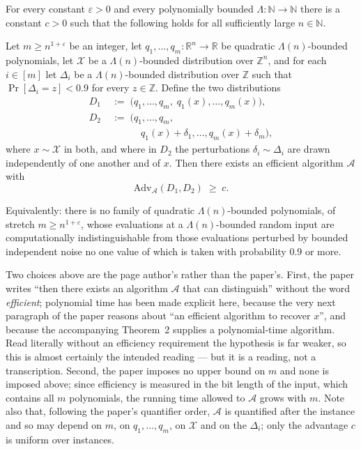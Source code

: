\documentclass{aicr-conjecture}
\newcommand{\ZZ}{\mathbb{Z}}
\newcommand{\RR}{\mathbb{R}}
\newcommand{\NN}{\mathbb{N}}
\newcommand{\cA}{\mathcal{A}}
\newcommand{\cX}{\mathcal{X}}
\newcommand{\Adv}{\mathrm{Adv}}
\begin{document}
\begin{conjecture}\label{conj:main}
For every constant $\varepsilon > 0$ and every polynomially bounded
$\Lambda : \NN \to \NN$ there is a constant $c > 0$ such that the
following holds for all sufficiently large $n \in \NN$.

Let $m \ge n^{1+\varepsilon}$ be an integer, let
$q_1, \dots, q_m : \RR^n \to \RR$ be quadratic $\Lambda(n)$-bounded
polynomials, let $\cX$ be a $\Lambda(n)$-bounded distribution over
$\ZZ^n$, and for each $i \in [m]$ let $\Delta_i$ be a
$\Lambda(n)$-bounded distribution over $\ZZ$ such that
$\Pr[\Delta_i = z] < 0.9$ for every $z \in \ZZ$. Define the two
distributions
\begin{align*}
  D_1 &\;:=\; \bigl( q_1, \dots, q_m,\; q_1(x), \dots, q_m(x) \bigr), \\
  D_2 &\;:=\; \bigl( q_1, \dots, q_m, \\
      &\qquad\quad\; q_1(x) + \delta_1, \dots, q_m(x) + \delta_m \bigr),
\end{align*}
where $x \sim \cX$ in both, and where in $D_2$ the perturbations
$\delta_i \sim \Delta_i$ are drawn independently of one another and of
$x$. Then there exists an efficient algorithm $\cA$ with
\[
  \Adv_{\cA}(D_1, D_2) \;\ge\; c .
\]

Equivalently: there is no family of quadratic $\Lambda(n)$-bounded
polynomials, of stretch $m \ge n^{1+\varepsilon}$, whose evaluations at
a $\Lambda(n)$-bounded random input are computationally
indistinguishable from those evaluations perturbed by bounded
independent noise no one value of which is taken with probability $0.9$
or more.
\end{conjecture}

\begin{remark}\label{rem:readings}
Two choices above are the page author's rather than the paper's. First,
the paper writes ``then there exists an algorithm $\cA$ that can
distinguish'' without the word \emph{efficient}; polynomial time has
been made explicit here, because the very next paragraph of the paper
reasons about ``an efficient algorithm to recover $x$'', and because
the accompanying Theorem~2 supplies a polynomial-time algorithm. Read
literally without an efficiency requirement the hypothesis is far
weaker, so this is almost certainly the intended reading --- but it is
a reading, not a transcription. Second, the paper imposes no upper
bound on $m$ and none is imposed above; since efficiency is measured in
the bit length of the input, which contains all $m$ polynomials, the
running time allowed to $\cA$ grows with $m$. Note also that, following
the paper's quantifier order, $\cA$ is quantified after the instance
and so may depend on $m$, on $q_1, \dots, q_m$, on $\cX$ and on the
$\Delta_i$; only the advantage $c$ is uniform over instances.
\end{remark}
\end{document}
